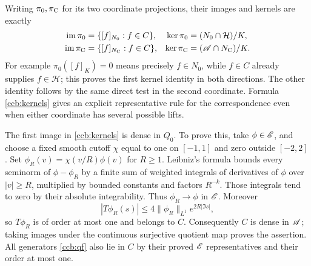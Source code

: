 Writing $\pi_0,\pi_{\rm C}$ for its two coordinate projections, their
images and kernels are exactly
\begin{align}
 \operatorname{im}\pi_0&=\{[f]_{N_0}:f\in C\},&
 \ker\pi_0&=(N_0\cap\mathcal H)/K,\notag\\
 \operatorname{im}\pi_{\rm C}&=\{[f]_{N_{\rm C}}:f\in C\},&
 \ker\pi_{\rm C}&=(\mathscr A\cap N_{\rm C})/K.
 \label{ccb:kernels}
\end{align}
For example $\pi_0([f]_K)=0$ means precisely $f\in N_0$, while
$f\in C$ already supplies $f\in\mathcal H$; this proves the first
kernel identity in both directions. The other identity follows by
the same direct test in the second coordinate. Formula
\eqref{ccb:kernels} gives an explicit representative rule for the
correspondence even when either coordinate has several possible lifts.

The first image in \eqref{ccb:kernels} is dense in $Q_0$.
To prove this, take $\phi\in\mathscr E$, and choose a fixed smooth cutoff
$\chi$ equal to one on $[-1,1]$ and zero outside $[-2,2]$.
Set $\phi_R(v)=\chi(v/R)\phi(v)$ for $R\geq1$.
Leibniz's formula bounds every seminorm of $\phi-\phi_R$ by a
finite sum of weighted integrals of derivatives of $\phi$ over
$|v|\geq R$, multiplied by bounded constants and factors $R^{-k}$.
Those integrals tend to zero by their absolute integrability. Thus
$\phi_R\to\phi$ in $\mathscr E$. Moreover
\[
 |T\phi_R(s)|\leq4\|\phi_R\|_{L^1}e^{2R|\Im s|},
\]
so $T\phi_R$ is of order at most one and belongs to $C$.
Consequently $C$ is dense in $\mathscr A$; taking images under the continuous
surjective quotient map proves the assertion. All generators
\eqref{ccb:qf} also lie in $C$ by their proved $\mathscr E$ representatives
and their order at most one.

